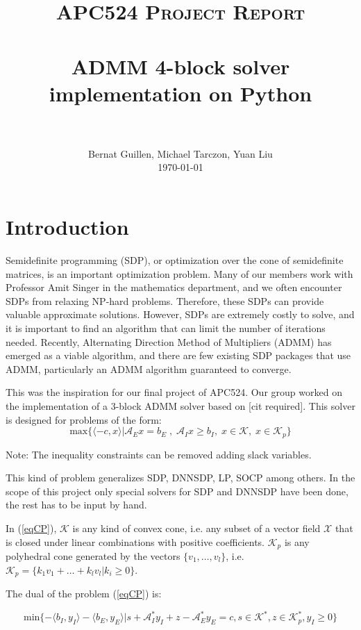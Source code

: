 \documentclass[paper=a4, fontsize=11pt]{scrartcl}
\title{
		\usefont{OT1}{bch}{b}{n}
		\normalfont \normalsize \textsc{APC524 Project Report} \\ [25pt]
		\horrule{0.5pt} \\[0.4cm]
		\huge ADMM 4-block solver implementation on Python \\
		\horrule{2pt} \\[0.5cm]
}
\author{
		\normalfont 								\normalsize
        Bernat Guillen, Michael Tarczon, Yuan Liu\\[-3pt]		\normalsize
        \today
}
\date{}
\numberwithin{equation}{section}		%
\numberwithin{figure}{section}			%
\numberwithin{table}{section}				%
\begin{document}
\maketitle
\section{Introduction}
Semidefinite programming (SDP), or optimization over the cone of semidefinite matrices, is an important optimization problem.  Many of our members work with Professor Amit Singer in the mathematics department, and we often encounter SDPs from relaxing NP-hard problems.  Therefore, these SDPs can provide valuable approximate solutions.  However, SDPs are extremely costly to solve, and it is important to find an algorithm that can limit the number of iterations needed.  Recently, Alternating Direction Method of Multipliers (ADMM) has emerged as a viable algorithm, and there are few existing SDP packages that use ADMM, particularly an ADMM algorithm guaranteed to converge.

This was the inspiration for our final project of APC524. Our group worked on the implementation of a 3-block ADMM solver based on [cit required]. This solver is designed for problems of the form:
\begin{equation}
\label{eqCP}
	\text{max}\{\langle -c,x\rangle | \mathcal{A}_E x = b_E\;,\;\mathcal{A}_I x\geq b_I, \;x\in \mathcal{K},\; x\in\mathcal{K}_p\}
\end{equation}

Note: The inequality constraints can be removed adding slack variables.

This kind of problem generalizes SDP, DNNSDP, LP, SOCP among others. In the scope of this project only special solvers for SDP and DNNSDP have been done, the rest has to be input by hand. 

In (\ref{eqCP}), $\mathcal{K}$ is any kind of convex cone, i.e. any subset of a vector field $\mathcal{X}$ that is closed under linear combinations with positive coefficients. $\mathcal{K}_p$ is any polyhedral cone generated by the vectors $\{v_1,\dots,v_l\}$, i.e. $\mathcal{K}_p = \{k_1v_1 + \dots + k_l v_l | k_i \geq 0\}$.

The dual of the problem (\ref{eqCP}) is:

\begin{equation}
\label{eqCPdual}
\text{min}\{-\langle b_I , y_I\rangle -\langle b_E , y_E\rangle | s + \mathcal{A}^{*}_{I} y_I + z - \mathcal{A}^{*}_{E} y_E = c, s\in \mathcal{K}^*, z \in \mathcal{K}_p^*, y_I \geq 0\}
\end{equation}
\end{document}
